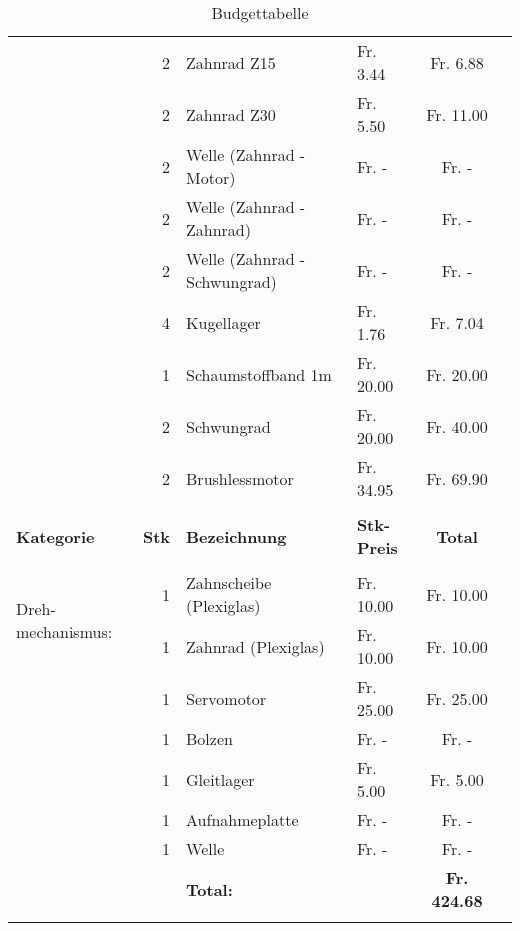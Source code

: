 \begin{longtable}{p{1.7cm}rllcc}
               & 2     & Zahnrad Z15 	        	  &  Fr. 3.44  &  Fr. 6.88  \\
               & 2     & Zahnrad Z30 	         	  &  Fr. 5.50  &  Fr. 11.00 \\
               & 2     & Welle (Zahnrad - Motor)      &  Fr. -     &  Fr. -     \\
               & 2     & Welle (Zahnrad - Zahnrad)    &  Fr. -     &  Fr. -     \\
               & 2     & Welle (Zahnrad - Schwungrad) &  Fr. -     &  Fr. -     \\
               & 4     & Kugellager                   &  Fr. 1.76  &  Fr. 7.04  \\
               & 1     & Schaumstoffband 1m           &  Fr. 20.00 &  Fr. 20.00 \\
               & 2     & Schwungrad                   &  Fr. 20.00 &  Fr. 40.00 \\
               & 2     & Brushlessmotor               &  Fr. 34.95 &  Fr. 69.90 \\
               &       &                              &            &            \\
    \newpage
    \textbf{Kategorie} & \textbf{Stk} & \textbf{Bezeichnung} & \textbf{Stk-Preis}
    & \textbf{Total} \\
    \hline     &       &                              &            &            \\
    \multirow{2}{1.7cm}{Dreh-mechanismus:} 
               & 1     & Zahnscheibe (Plexiglas)      &  Fr. 10.00 &  Fr. 10.00 \\
               & 1     & Zahnrad (Plexiglas)          &  Fr. 10.00 &  Fr. 10.00 \\
               & 1     & Servomotor                   &  Fr. 25.00 &  Fr. 25.00 \\
               & 1     & Bolzen                       &  Fr. -     &  Fr. -     \\
               & 1     & Gleitlager                   &  Fr. 5.00  &  Fr. 5.00  \\
               & 1     & Aufnahmeplatte               &  Fr. -     &  Fr. -     \\
               & 1     & Welle                        &  Fr. -     &  Fr. -     \\
               &       & \textbf{Total:} & \textbf{} & \textbf{ Fr. 424.68 }    \\
       \caption{Budgettabelle}
       \label{tab:Kostentabelle}
    \end{longtable}
